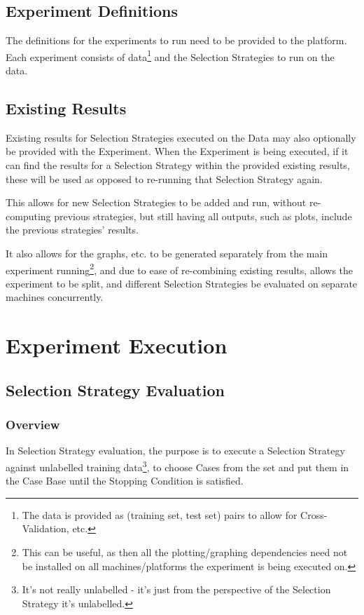\documentclass[a4paper,11pt]{report}
\begin{document}
\subsection{Experiment Definitions}
The definitions for the experiments to run need to be provided to the platform. Each experiment consists of data\footnote{ The data is provided as (training set, test set) pairs to allow for Cross-Validation, etc.} and the Selection Strategies to run on the data.

\subsection{Existing Results}
Existing results for Selection Strategies executed on the Data may also optionally be provided with the Experiment. When the Experiment is being executed, if it can find the results for a Selection Strategy within the provided existing results, these will be used as opposed to re-running that Selection Strategy again.

This allows for new Selection Strategies to be added and run, without re-computing previous strategies, but still having all outputs, such as plots, include the previous strategies' results.

It also allows for the graphs, etc. to be generated separately from the main experiment running\footnote{This can be useful, as then all the plotting/graphing dependencies need not be installed on all machines/platforms the experiment is being executed on.}, and due to ease of re-combining existing results, allows the experiment to be split, and different Selection Strategies be evaluated on separate machines concurrently.

\section{Experiment Execution}
\subsection{Selection Strategy Evaluation}
\subsubsection{Overview}
In Selection Strategy evaluation, the purpose is to execute a Selection Strategy against unlabelled training data\footnote{It's not really unlabelled - it's just from the perspective of the Selection Strategy it's unlabelled.}, to choose Cases from the set and put them in the Case Base until the Stopping Condition is satisfied.
\end{document}
